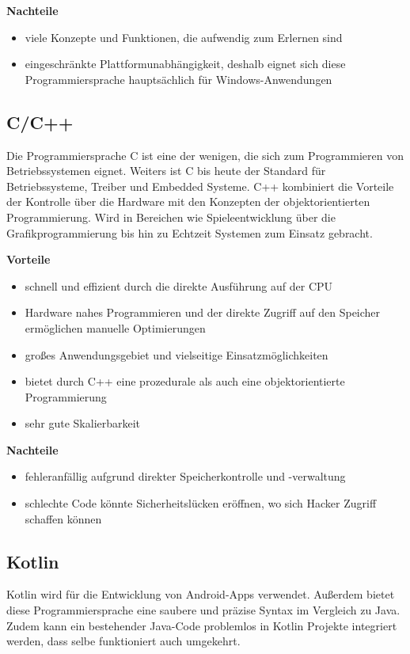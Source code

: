 \textbf{Nachteile}
\begin{itemize}
	\item viele Konzepte und Funktionen, die aufwendig zum Erlernen sind
	\item eingeschränkte Plattformunabhängigkeit, deshalb eignet sich diese Programmiersprache hauptsächlich für Windows-Anwendungen
\end{itemize}

\subsection{C/C++}
Die Programmiersprache C ist eine der wenigen, die sich zum Programmieren von Betriebssystemen eignet. Weiters ist C bis heute der Standard für Betriebssysteme, Treiber und Embedded Systeme. C++ kombiniert die Vorteile der Kontrolle über die Hardware mit den Konzepten der objektorientierten Programmierung. Wird in Bereichen wie Spieleentwicklung über die Grafikprogrammierung bis hin zu Echtzeit Systemen zum Einsatz gebracht. \textcite{Programmiersprachen}

\textbf{Vorteile}
\begin{itemize}
	\item schnell und effizient durch die direkte Ausführung auf der CPU
	\item Hardware nahes Programmieren und der direkte Zugriff auf den Speicher ermöglichen manuelle Optimierungen
	\item großes Anwendungsgebiet und vielseitige Einsatzmöglichkeiten
	\item bietet durch C++ eine prozedurale als auch eine objektorientierte Programmierung
	\item sehr gute Skalierbarkeit
\end{itemize}

\textbf{Nachteile}
\begin{itemize}
	\item fehleranfällig aufgrund direkter Speicherkontrolle und -verwaltung
	\item schlechte Code könnte Sicherheitslücken eröffnen, wo sich Hacker Zugriff schaffen können
\end{itemize}



\subsection{Kotlin}
Kotlin wird für die Entwicklung von Android-Apps verwendet. Außerdem bietet diese Programmiersprache eine saubere und präzise Syntax im Vergleich zu Java. Zudem kann ein bestehender Java-Code problemlos in Kotlin Projekte integriert werden, dass selbe funktioniert auch umgekehrt. \textcite{Kotlin}

